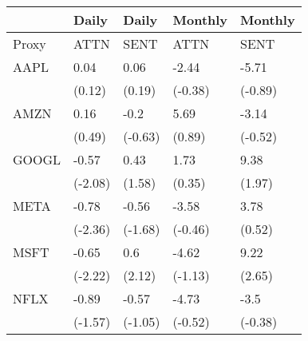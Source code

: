 \begin{tabular}{lllll}
\toprule
{} &    Daily &    Daily &  Monthly &  Monthly \\
\midrule
Proxy &     ATTN &     SENT &     ATTN &     SENT \\
AAPL  &     0.04 &     0.06 &    -2.44 &    -5.71 \\
      &   (0.12) &   (0.19) &  (-0.38) &  (-0.89) \\
AMZN  &     0.16 &     -0.2 &     5.69 &    -3.14 \\
      &   (0.49) &  (-0.63) &   (0.89) &  (-0.52) \\
GOOGL &    -0.57 &     0.43 &     1.73 &     9.38 \\
      &  (-2.08) &   (1.58) &   (0.35) &   (1.97) \\
META  &    -0.78 &    -0.56 &    -3.58 &     3.78 \\
      &  (-2.36) &  (-1.68) &  (-0.46) &   (0.52) \\
MSFT  &    -0.65 &      0.6 &    -4.62 &     9.22 \\
      &  (-2.22) &   (2.12) &  (-1.13) &   (2.65) \\
NFLX  &    -0.89 &    -0.57 &    -4.73 &     -3.5 \\
      &  (-1.57) &  (-1.05) &  (-0.52) &  (-0.38) \\
\bottomrule
\end{tabular}
